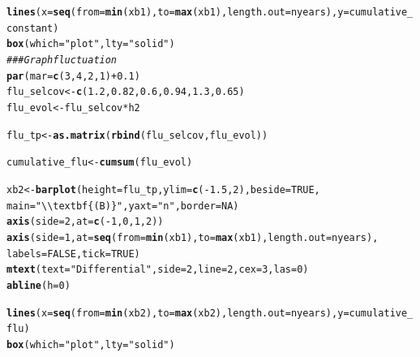 \documentclass{article}\usepackage[]{graphicx}\usepackage[]{color}
\makeatletter
\newcommand{\hlnum}[1]{\textcolor[rgb]{0.686,0.059,0.569}{#1}}%
\newcommand{\hlstr}[1]{\textcolor[rgb]{0.192,0.494,0.8}{#1}}%
\newcommand{\hlcom}[1]{\textcolor[rgb]{0.678,0.584,0.686}{\textit{#1}}}%
\newcommand{\hlopt}[1]{\textcolor[rgb]{0,0,0}{#1}}%
\newcommand{\hlstd}[1]{\textcolor[rgb]{0.345,0.345,0.345}{#1}}%
\newcommand{\hlkwb}[1]{\textcolor[rgb]{0.69,0.353,0.396}{#1}}%
\newcommand{\hlkwc}[1]{\textcolor[rgb]{0.333,0.667,0.333}{#1}}%
\newcommand{\hlkwd}[1]{\textcolor[rgb]{0.737,0.353,0.396}{\textbf{#1}}}%
\newenvironment{kframe}{%
 \def\at@end@of@kframe{}%
 \ifinner\ifhmode%
  \def\at@end@of@kframe{\end{minipage}}%
  \begin{minipage}{\columnwidth}%
 \fi\fi%
 \def\FrameCommand##1{\hskip\@totalleftmargin \hskip-\fboxsep
 \colorbox{shadecolor}{##1}\hskip-\fboxsep
     \hskip-\linewidth \hskip-\@totalleftmargin \hskip\columnwidth}%
 \MakeFramed {\advance\hsize-\width
   \@totalleftmargin\z@ \linewidth\hsize
   \@setminipage}}%
 {\par\unskip\endMakeFramed%
 \at@end@of@kframe}
\newenvironment{knitrout}{}{} %
\makeatother
\begin{document}
\begin{knitrout}
\begin{kframe}
\begin{alltt}
\hlkwd{lines}\hlstd{(}\hlkwc{x}\hlstd{=}\hlkwd{seq}\hlstd{(}\hlkwc{from}\hlstd{=}\hlkwd{min}\hlstd{(xb1),} \hlkwc{to}\hlstd{=}\hlkwd{max}\hlstd{(xb1),} \hlkwc{length.out} \hlstd{= nyears),} \hlkwc{y}\hlstd{=cumulative_constant)}
\hlkwd{box}\hlstd{(}\hlkwc{which} \hlstd{=} \hlstr{"plot"}\hlstd{,} \hlkwc{lty} \hlstd{=} \hlstr{"solid"}\hlstd{)}
\hlcom{### Graph fluctuation}
\hlkwd{par}\hlstd{(}\hlkwc{mar}\hlstd{=}\hlkwd{c}\hlstd{(}\hlnum{3}\hlstd{,} \hlnum{4}\hlstd{,} \hlnum{2}\hlstd{,} \hlnum{1}\hlstd{)} \hlopt{+} \hlnum{0.1}\hlstd{)}
\hlstd{flu_selcov} \hlkwb{<-} \hlkwd{c}\hlstd{(}\hlnum{1.2}\hlstd{,}\hlnum{0.82}\hlstd{,}\hlnum{0.6}\hlstd{,}\hlnum{0.94}\hlstd{,}\hlnum{1.3}\hlstd{,}\hlnum{0.65}\hlstd{)}
\hlstd{flu_evol} \hlkwb{<-} \hlstd{flu_selcov} \hlopt{*} \hlstd{h2}

\hlstd{flu_tp} \hlkwb{<-} \hlkwd{as.matrix}\hlstd{(}\hlkwd{rbind}\hlstd{(flu_selcov, flu_evol))}

\hlstd{cumulative_flu} \hlkwb{<-} \hlkwd{cumsum}\hlstd{(flu_evol)}

\hlstd{xb2} \hlkwb{<-} \hlkwd{barplot}\hlstd{(}\hlkwc{height} \hlstd{= flu_tp,} \hlkwc{ylim} \hlstd{=} \hlkwd{c}\hlstd{(}\hlopt{-}\hlnum{1.5}\hlstd{,}\hlnum{2}\hlstd{),} \hlkwc{beside} \hlstd{=} \hlnum{TRUE}\hlstd{,}
               \hlkwc{main}\hlstd{=}\hlstr{"\textbackslash{}\textbackslash{}textbf\{(B)\}"}\hlstd{,} \hlkwc{yaxt}\hlstd{=}\hlstr{"n"}\hlstd{,} \hlkwc{border} \hlstd{=} \hlnum{NA}\hlstd{)}
\hlkwd{axis}\hlstd{(}\hlkwc{side}\hlstd{=}\hlnum{2}\hlstd{,} \hlkwc{at} \hlstd{=} \hlkwd{c}\hlstd{(}\hlopt{-}\hlnum{1}\hlstd{,}\hlnum{0}\hlstd{,}\hlnum{1}\hlstd{,}\hlnum{2}\hlstd{))}
\hlkwd{axis}\hlstd{(}\hlkwc{side}\hlstd{=}\hlnum{1}\hlstd{,} \hlkwc{at} \hlstd{=} \hlkwd{seq}\hlstd{(}\hlkwc{from}\hlstd{=}\hlkwd{min}\hlstd{(xb1),} \hlkwc{to}\hlstd{=}\hlkwd{max}\hlstd{(xb1),} \hlkwc{length.out} \hlstd{= nyears),}
     \hlkwc{labels} \hlstd{=} \hlnum{FALSE}\hlstd{,}\hlkwc{tick} \hlstd{=} \hlnum{TRUE}\hlstd{)}
\hlkwd{mtext}\hlstd{(}\hlkwc{text} \hlstd{=} \hlstr{"Differential"}\hlstd{,} \hlkwc{side} \hlstd{=} \hlnum{2}\hlstd{,} \hlkwc{line} \hlstd{=} \hlnum{2}\hlstd{,} \hlkwc{cex}\hlstd{=}\hlnum{3}\hlstd{,} \hlkwc{las}\hlstd{=}\hlnum{0}\hlstd{)}
\hlkwd{abline}\hlstd{(}\hlkwc{h}\hlstd{=}\hlnum{0}\hlstd{)}

\hlkwd{lines}\hlstd{(}\hlkwc{x}\hlstd{=}\hlkwd{seq}\hlstd{(}\hlkwc{from}\hlstd{=}\hlkwd{min}\hlstd{(xb2),} \hlkwc{to}\hlstd{=}\hlkwd{max}\hlstd{(xb2),} \hlkwc{length.out} \hlstd{= nyears),} \hlkwc{y}\hlstd{=cumulative_flu)}
\hlkwd{box}\hlstd{(}\hlkwc{which} \hlstd{=} \hlstr{"plot"}\hlstd{,} \hlkwc{lty} \hlstd{=} \hlstr{"solid"}\hlstd{)}


\end{alltt}
\end{kframe}
\end{knitrout}
\end{document}
